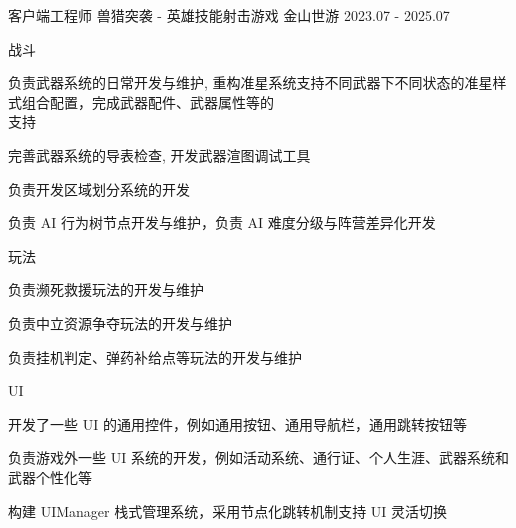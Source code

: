 

\begin{cventries}

\cventry
    {客户端工程师} %
    {兽猎突袭 -  英雄技能射击游戏} %
    {金山世游} %
    {2023.07 - 2025.07} %
    {
        \begin{cvitems}
            \item {战斗
                \begin{cvsubitems}
                    \item {负责武器系统的日常开发与维护, 重构准星系统支持不同武器下不同状态的准星样式组合配置，完成武器配件、武器属性等的\\支持}
                    \item {完善武器系统的导表检查, 开发武器渲图调试工具}
                    \item {负责开发区域划分系统的开发}
                    \item {负责 AI 行为树节点开发与维护，负责 AI 难度分级与阵营差异化开发}
                \end{cvsubitems}
            }
            \item {玩法
                \begin{cvsubitems}
                    \item {负责濒死救援玩法的开发与维护}
                    \item {负责中立资源争夺玩法的开发与维护}
                    \item {负责挂机判定、弹药补给点等玩法的开发与维护}
                \end{cvsubitems}
            }
            \item {UI
                \begin{cvsubitems}
                    \item {开发了一些 UI 的通用控件，例如通用按钮、通用导航栏，通用跳转按钮等}
                    \item {负责游戏外一些 UI 系统的开发，例如活动系统、通行证、个人生涯、武器系统和武器个性化等}
                    \item {构建 UIManager 栈式管理系统，采用节点化跳转机制支持 UI 灵活切换}

\end{cvsubitems}}
\end{cvitems}}
\end{cventries}

